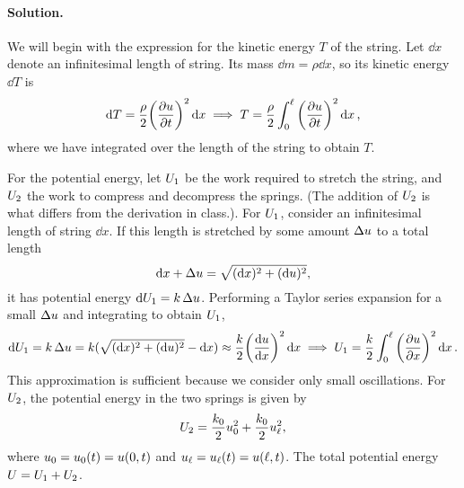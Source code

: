 \documentclass[11pt]{article}
\newenvironment{solution}
{
    \paragraph{Solution.}
    \ignorespaces
}
{
}
\begin{document}
\begin{solution}
	We will begin with the expression for the kinetic energy $T$ of the string.  Let $\dd{x}$ denote an infinitesimal length of string.  Its mass $\dd{m} = \rho \dd{x}$, so its kinetic energy $\dd{T}$ is
\begin{equation} \label{T}
	\dd{T} = \frac{\rho}{2} \bigg( \pdv{u}{t} \bigg)^2 \dd{x} \implies T = \frac{\rho}{2} \int_0^\ell \bigg( \pdv{u}{t} \bigg)^2 \dd{x},
\end{equation}
	where we have integrated over the length of the string to obtain $T$.
	
	For the potential energy, let $U_1$ be the work required to stretch the string, and $U_2$ the work to compress and decompress the springs.  (The addition of $U_2$ is what differs from the derivation in class.).  For $U_1$, consider an infinitesimal length of string $\dd{x}$.  If this length is stretched by some amount $\Delta u$ to a total length
	\begin{equation}
		\dd{x} + \Delta u = \sqrt{(\dd{x})^2 + (\dd{u})^2},
	\end{equation}
	it has potential energy $\dd{U_1} = k \,\Delta u$.  Performing a Taylor series expansion for a small $\Delta u$ and integrating to obtain $U_1$,
	\begin{equation} \label{U1}
		\dd{U_1} = k \,\Delta u = k (\sqrt{(\dd{x})^2 + (\dd{u})^2} - \dd{x}) \approx \frac{k}{2} \bigg( \dv{u}{x} \bigg)^2 \dd{x} \implies U_1 = \frac{k}{2} \int_0^\ell \bigg( \pdv{u}{x} \bigg)^2 \dd{x}.
	\end{equation}
	This approximation is sufficient because we consider only small oscillations.  For $U_2$, the potential energy in the two springs is given by
	\begin{equation} \label{U2}
		U_2 = \frac{k_0}{2} u_0^2 + \frac{k_0}{2} u_\ell^2,
	\end{equation}
	where $u_0 = u_0(t) = u(0, t)$ and $u_\ell = u_\ell(t) = u(\ell, t)$.  The total potential energy $U = U_1 + U_2$.
	

\end{solution}
\end{document}
